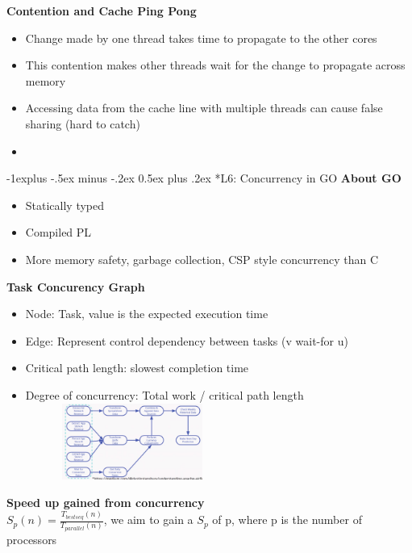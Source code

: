 \documentclass[10pt, landscape]{article}
\makeatletter
\renewcommand{\subsection}{\@startsection{subsection}{2}{0mm}%
                                {-1explus -.5ex minus -.2ex}%
                                {0.5ex plus .2ex}%
                                {\normalfont\normalsize\bfseries}}
\makeatother
\begin{document}
\begin{multicols}{4}
\textbf{Contention and Cache Ping Pong} \\
\begin{itemize}
    \item Change made by one thread takes time to propagate to the other cores
    \item This contention makes other threads wait for the change to propagate across memory
    \item Accessing data from the cache line with multiple threads can cause false sharing (hard to catch) 
    \item 
\end{itemize}

\subsection*{L6: Concurrency in GO} 
\textbf{About GO} \\
\begin{itemize}
    \item Statically typed 
    \item Compiled PL 
    \item More memory safety, garbage collection, CSP style concurrency than C
\end{itemize}

\textbf{Task Concurency Graph} \\
\begin{itemize}
    \item Node: Task, value is the expected execution time 
    \item Edge: Represent control dependency between tasks (v wait-for u)
    \item Critical path length: slowest completion time 
    \item Degree of concurrency: Total work / critical path length 
    \includegraphics*[width=7cm,height=2.5cm]{taskconcurrency.png}\\
\end{itemize}

\textbf{Speed up gained from concurrency} \\
$S_p(n) = \frac{T_{best seq}(n)}{T_{parallel}(n)}$, we aim to gain a $S_p$ of p, where p is the number of processors \\


\end{multicols}
\end{document}
